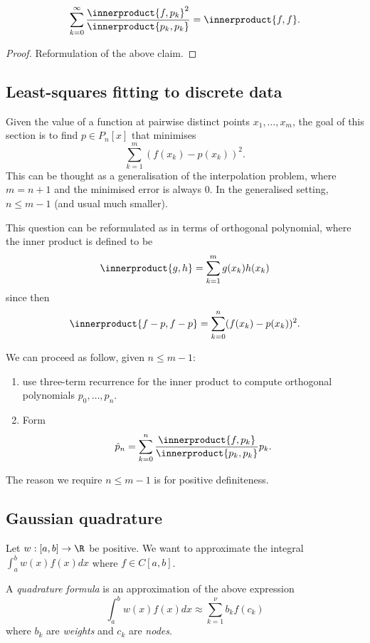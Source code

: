 \documentclass[a4paper]{article}
\newcommand*{\inner}{\innerproduct}
\begin{document}
\begin{theorem}
  \[
    \sum_{k = 0}^\infty \frac{\inner{f, p_k}^2}{\inner{p_k, p_k}} = \inner{f, f}.
  \]
\end{theorem}

\begin{proof}
  Reformulation of the above claim.
\end{proof}

\subsection{Least-squares fitting to discrete data}

Given the value of a function at pairwise distinct points \(x_1, \dots, x_m\), the goal of this section is to find \(p \in P_n[x]\) that minimises
\[
  \sum_{k = 1}^m (f(x_k) - p(x_k))^2.
\]
This can be thought as a generalisation of the interpolation problem, where \(m = n + 1\) and the minimised error is always \(0\). In the generalised setting, \(n \leq m - 1\) (and usual much smaller).

This question can be reformulated as in terms of orthogonal polynomial, where the inner product is defined to be
\[
  \inner{g, h} = \sum_{k = 1}^m g(x_k)h(x_k)
\]
since then
\[
  \inner{f - p, f - p} = \sum_{k = 0}^n (f(x_k) - p(x_k))^2.
\]

We can proceed as follow, given \(n \leq m - 1\):
\begin{enumerate}
\item use three-term recurrence for the inner product to compute orthogonal polynomials \(p_0, \dots, p_n\).
\item Form
  \[
    \hat p_n = \sum_{k = 0}^n \frac{\inner{f, p_k}}{\inner{p_k, p_k}}p_k.
  \]
\end{enumerate}
The reason we require \(n \leq m - 1\) is for positive definiteness.

\subsection{Gaussian quadrature}

\begin{question}
  Let \(w: [a, b] \to \R\) be positive. We want to approximate the integral \(\int_a^b w(x)f(x) dx\) where \(f \in C[a, b]\).
\end{question}
A \emph{quadrature formula} is an approximation of the above expression
\begin{equation}
  \label{eqn:quadrature}
  \int_a^b w(x)f(x) dx \approx \sum_{k = 1}^\nu b_kf(c_k)
  \tag{\(\ast\)}
\end{equation}
where \(b_k\) are \emph{weights} and \(c_k\) are \emph{nodes}.
\end{document}
